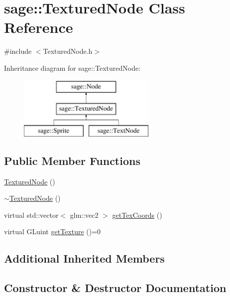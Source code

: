 \hypertarget{classsage_1_1TexturedNode}{}\section{sage\+::Textured\+Node Class Reference}
\label{classsage_1_1TexturedNode}


{\ttfamily \#include $<$Textured\+Node.\+h$>$}

Inheritance diagram for sage\+::Textured\+Node\+:\begin{figure}[H]
\begin{center}
\leavevmode
\includegraphics[height=3.000000cm]{classsage_1_1TexturedNode}
\end{center}
\end{figure}
\subsection*{Public Member Functions}
\begin{DoxyCompactItemize}
\item 
\mbox{\hyperlink{classsage_1_1TexturedNode_a90aacfe1eb94e56ecf8176d7c7b74388}{Textured\+Node}} ()
\item 
\mbox{\hyperlink{classsage_1_1TexturedNode_a2c67c0ec8c8839308a56e0aea6839b3e}{$\sim$\+Textured\+Node}} ()
\item 
virtual std\+::vector$<$ glm\+::vec2 $>$ \mbox{\hyperlink{classsage_1_1TexturedNode_ada858d240f8074fd97e8a72e74d18a30}{get\+Tex\+Coords}} ()
\item 
virtual G\+Luint \mbox{\hyperlink{classsage_1_1TexturedNode_a079cea0b12a1d0e3ea69459546736c0f}{get\+Texture}} ()=0
\end{DoxyCompactItemize}
\subsection*{Additional Inherited Members}


\subsection{Constructor \& Destructor Documentation}
\mbox{\label{classsage_1_1TexturedNode_a90aacfe1eb94e56ecf8176d7c7b74388}} 
